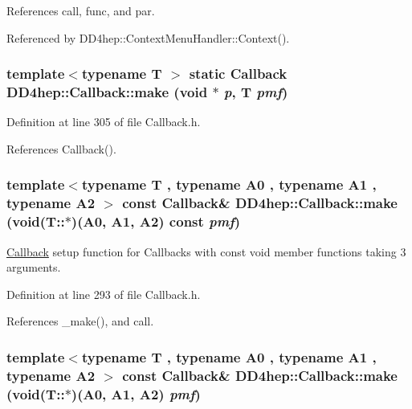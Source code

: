 References call, func, and par.

Referenced by DD4hep::ContextMenuHandler::Context().\hypertarget{class_d_d4hep_1_1_callback_a548711851bb34b150960188fe4702646}{
\subsubsection[{make}]{\setlength{\rightskip}{0pt plus 5cm}template$<$typename T $>$ static {\bf Callback} DD4hep::Callback::make (void $\ast$ {\em p}, \/  {\bf T} {\em pmf})}}
\label{class_d_d4hep_1_1_callback_a548711851bb34b150960188fe4702646}


Definition at line 305 of file Callback.h.

References Callback().\hypertarget{class_d_d4hep_1_1_callback_a351fc7781de507710ea9a7d1449a6029}{
\subsubsection[{make}]{\setlength{\rightskip}{0pt plus 5cm}template$<$typename T , typename A0 , typename A1 , typename A2 $>$ const {\bf Callback}\& DD4hep::Callback::make (void(T::$\ast$)(A0, A1, A2) const  {\em pmf})}}
\label{class_d_d4hep_1_1_callback_a351fc7781de507710ea9a7d1449a6029}


\hyperlink{class_d_d4hep_1_1_callback}{Callback} setup function for Callbacks with const void member functions taking 3 arguments. 

Definition at line 293 of file Callback.h.

References \_\-make(), and call.\hypertarget{class_d_d4hep_1_1_callback_aa25f82768896694845261606a1ce386b}{
\subsubsection[{make}]{\setlength{\rightskip}{0pt plus 5cm}template$<$typename T , typename A0 , typename A1 , typename A2 $>$ const {\bf Callback}\& DD4hep::Callback::make (void(T::$\ast$)(A0, A1, A2) {\em pmf})}}
\label{class_d_d4hep_1_1_callback_aa25f82768896694845261606a1ce386b}


